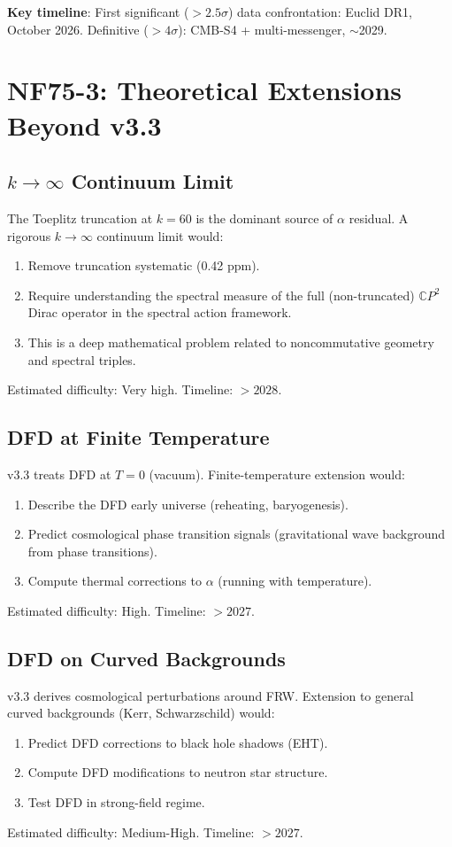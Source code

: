 \documentclass[11pt,a4paper]{article}
\newcommand{\CP}{\mathbb{C}P}
\begin{document}
\textbf{Key timeline}: First significant ($> 2.5\sigma$) data confrontation: Euclid DR1, October 2026. Definitive ($> 4\sigma$): CMB-S4 + multi-messenger, $\sim$2029.

\section{NF75-3: Theoretical Extensions Beyond v3.3}

\subsection{$k \to \infty$ Continuum Limit}
The Toeplitz truncation at $k = 60$ is the dominant source of $\alpha$ residual. A rigorous $k \to \infty$ continuum limit would:
\begin{enumerate}[nosep]
\item Remove truncation systematic (0.42 ppm).
\item Require understanding the spectral measure of the full (non-truncated) $\CP^2$ Dirac operator in the spectral action framework.
\item This is a deep mathematical problem related to noncommutative geometry and spectral triples.
\end{enumerate}
Estimated difficulty: Very high. Timeline: $> 2028$.

\subsection{DFD at Finite Temperature}
v3.3 treats DFD at $T = 0$ (vacuum). Finite-temperature extension would:
\begin{enumerate}[nosep]
\item Describe the DFD early universe (reheating, baryogenesis).
\item Predict cosmological phase transition signals (gravitational wave background from phase transitions).
\item Compute thermal corrections to $\alpha$ (running with temperature).
\end{enumerate}
Estimated difficulty: High. Timeline: $> 2027$.

\subsection{DFD on Curved Backgrounds}
v3.3 derives cosmological perturbations around FRW. Extension to general curved backgrounds (Kerr, Schwarzschild) would:
\begin{enumerate}[nosep]
\item Predict DFD corrections to black hole shadows (EHT).
\item Compute DFD modifications to neutron star structure.
\item Test DFD in strong-field regime.
\end{enumerate}
Estimated difficulty: Medium-High. Timeline: $> 2027$.
\end{document}
